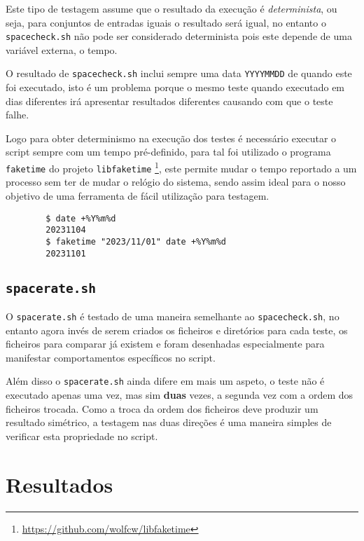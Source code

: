 Este tipo de testagem assume que o resultado da execução é \emph{determinista},
ou seja, para conjuntos de entradas iguais o resultado será igual, no entanto
o \Verb|spacecheck.sh| não pode ser considerado determinista pois este depende
de uma variável externa, o tempo.

O resultado de \Verb|spacecheck.sh| inclui sempre uma data \Verb|YYYYMMDD| de
quando este foi executado, isto é um problema porque o mesmo teste quando
executado em dias diferentes irá apresentar resultados diferentes causando com
que o teste falhe.

Logo para obter determinismo na execução dos testes é necessário executar o
script sempre com um tempo pré-definido, para tal foi utilizado o programa
\Verb|faketime| do projeto \Verb|libfaketime|
\footnote{\url{https://github.com/wolfcw/libfaketime}},
este permite mudar o tempo reportado a um processo sem ter de mudar o relógio
do sistema, sendo assim ideal para o nosso objetivo de uma ferramenta de fácil
utilização para testagem.

\begin{listing}[H]
	\centering
	\begin{verbatim}
		$ date +%Y%m%d
		20231104
		$ faketime "2023/11/01" date +%Y%m%d
		20231101
	\end{verbatim}
	\cprotect\caption{Exemplo do funcionamento de \Verb|faketime|.}
\end{listing}

\cprotect\subsection{\Verb|spacerate.sh|}

O \Verb|spacerate.sh| é testado de uma maneira semelhante ao
\Verb|spacecheck.sh|, no entanto agora invés de serem criados os ficheiros e
diretórios para cada teste, os ficheiros para comparar já existem e foram
desenhadas especialmente para manifestar comportamentos específicos no script.

Além disso o \Verb|spacerate.sh| ainda difere em mais um aspeto, o teste não é
executado apenas uma vez, mas sim \textbf{duas} vezes, a segunda vez com a ordem
dos ficheiros trocada. Como a troca da ordem dos ficheiros deve produzir um
resultado simétrico, a testagem nas duas direções é uma maneira simples de
verificar esta propriedade no script.

\section{Resultados}

